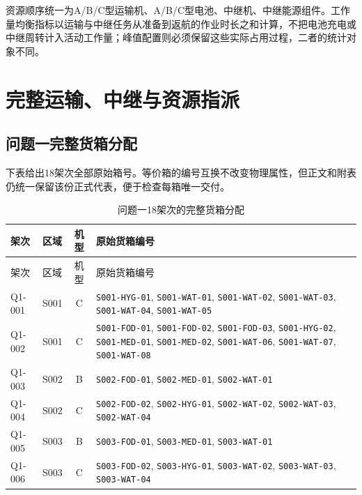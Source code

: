 \documentclass[withoutpreface,colorprint]{format}
\numberwithin{equation}{section}
\numberwithin{figure}{section}
\numberwithin{table}{section}
\begin{document}
资源顺序统一为A/B/C型运输机、A/B/C型电池、中继机、中继能源组件。工作量均衡指标以运输与中继任务从准备到返航的作业时长之和计算，不把电池充电或中继周转计入活动工作量；峰值配置则必须保留这些实际占用过程，二者的统计对象不同。

\section{完整运输、中继与资源指派}
\label{app:full_schedules}
\subsection{问题一完整货箱分配}
下表给出18架次全部原始箱号。等价箱的编号互换不改变物理属性，但正文和附表仍统一保留该份正式代表，便于检查每箱唯一交付。

\begin{longtable}{@{}llc>{\raggedright\arraybackslash}p{9.3cm}@{}}
\caption{问题一18架次的完整货箱分配}\label{tab:app_q1_boxes}\\
\toprule
架次 & 区域 & 机型 & 原始货箱编号\\
\midrule
\endfirsthead
\toprule
架次 & 区域 & 机型 & 原始货箱编号\\
\midrule
\endhead
Q1-001 & S001 & C & \texttt{S001-HYG-01}\allowbreak, \texttt{S001-WAT-01}\allowbreak, \texttt{S001-WAT-02}\allowbreak, \texttt{S001-WAT-03}\allowbreak, \texttt{S001-WAT-04}\allowbreak, \texttt{S001-WAT-05}\allowbreak\\
Q1-002 & S001 & C & \texttt{S001-FOD-01}\allowbreak, \texttt{S001-FOD-02}\allowbreak, \texttt{S001-FOD-03}\allowbreak, \texttt{S001-HYG-02}\allowbreak, \texttt{S001-MED-01}\allowbreak, \texttt{S001-MED-02}\allowbreak, \texttt{S001-WAT-06}\allowbreak, \texttt{S001-WAT-07}\allowbreak, \texttt{S001-WAT-08}\allowbreak\\
Q1-003 & S002 & B & \texttt{S002-FOD-01}\allowbreak, \texttt{S002-MED-01}\allowbreak, \texttt{S002-WAT-01}\allowbreak\\
Q1-004 & S002 & C & \texttt{S002-FOD-02}\allowbreak, \texttt{S002-HYG-01}\allowbreak, \texttt{S002-WAT-02}\allowbreak, \texttt{S002-WAT-03}\allowbreak, \texttt{S002-WAT-04}\allowbreak\\
Q1-005 & S003 & B & \texttt{S003-FOD-01}\allowbreak, \texttt{S003-MED-01}\allowbreak, \texttt{S003-WAT-01}\allowbreak\\
Q1-006 & S003 & C & \texttt{S003-FOD-02}\allowbreak, \texttt{S003-HYG-01}\allowbreak, \texttt{S003-WAT-02}\allowbreak, \texttt{S003-WAT-03}\allowbreak, \texttt{S003-WAT-04}\allowbreak\\

\end{longtable}
\end{document}
